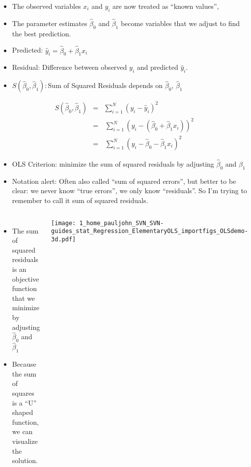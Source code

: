 \documentclass[10pt,english]{beamer}
\def\lyxframeend{} %
\begin{document}
\begin{itemize}
\item The observed variables $x_{i}$ and $y_{i}$ are now treated as ``known
values'', 
\item The parameter estimates $\hat{\beta}_{0}$ and $\hat{\beta}_{1}$
become variables that we adjust to find the best prediction.
\end{itemize}

\lyxframeend{}
\begin{itemize}
\item Predicted: $\hat{y}_{i}=\hat{\beta}_{0}+\hat{\beta}_{1}x_{i}$ 
\item Residual: Difference between observed $y_{i}$ and predicted $\hat{y}_{i}$.
\item $S(\hat{\beta}_{0},\hat{\beta}_{1}):$Sum of Squared Residuals depends
on $\hat{\beta}_{0}$, $\hat{\beta}_{1}$
\end{itemize}
\begin{eqnarray}
S(\hat{\beta}_{0},\hat{\beta}_{1}) & = & \sum_{i=1}^{N}(y_{i}-\hat{y}_{i})^{2}\\
 & = & \,\sum_{i=1}^{N}(y_{i}-(\hat{\beta}_{0}+\hat{\beta}_{1}x_{i}))^{2}\nonumber \\
 & = & \,\sum_{i=1}^{N}(y_{i}-\hat{\beta}_{0}-\hat{\beta}_{1}x_{i})^{2}\nonumber 
\end{eqnarray}

\begin{itemize}
\item OLS Criterion: minimize the sum of squared residuals by adjusting
$\hat{\beta}_{0}$ and $\hat{\beta}_{1}$
\item Notation alert: Often also called ``sum of squared errors'', but
better to be clear: we never know ``true errors'', we only know
``residuals''. So I'm trying to remember to call it sum of squared
residuals.
\end{itemize}

\lyxframeend{}
\begin{columns}%


\column{5cm}
\begin{itemize}
\item The sum of squared residuals is an objective function that we minimize
by adjusting $\hat{\beta}_{0}$ and $\hat{\beta}_{1}$
\item Because the sum of squares is a ``U'' shaped function, we can visualize
the solution.
\end{itemize}

\column{7cm}


\texttt{[image: 1\_home\_pauljohn\_SVN\_SVN-guides\_stat\_Regression\_ElementaryOLS\_importfigs\_OLSdemo-3d.pdf]}

\end{columns}%
\end{document}
